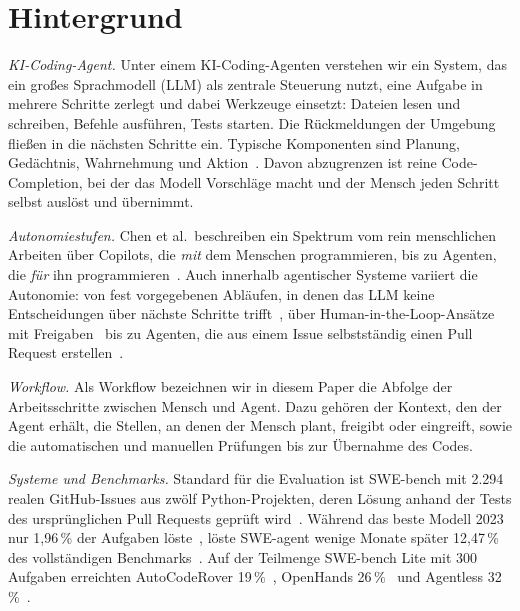 \section{Hintergrund}
\label{sec:hintergrund}

\textit{KI-Coding-Agent.} Unter einem KI-Coding-Agenten verstehen wir ein System, das ein großes Sprachmodell (LLM) als zentrale Steuerung nutzt, eine Aufgabe in mehrere Schritte zerlegt und dabei Werkzeuge einsetzt: Dateien lesen und schreiben, Befehle ausführen, Tests starten. Die Rückmeldungen der Umgebung fließen in die nächsten Schritte ein. Typische Komponenten sind Planung, Gedächtnis, Wahrnehmung und Aktion~\cite{liu2024agentsurvey}. Davon abzugrenzen ist reine Code-Completion, bei der das Modell Vorschläge macht und der Mensch jeden Schritt selbst auslöst und übernimmt.

\textit{Autonomiestufen.} Chen et al.\ beschreiben ein Spektrum vom rein menschlichen Arbeiten über Copilots, die \emph{mit} dem Menschen programmieren, bis zu Agenten, die \emph{für} ihn programmieren~\cite{chen2025codewithme}. Auch innerhalb agentischer Systeme variiert die Autonomie: von fest vorgegebenen Abläufen, in denen das LLM keine Entscheidungen über nächste Schritte trifft~\cite{xia2025agentless}, über Human-in-the-Loop-Ansätze mit Freigaben~\cite{takerngsaksiri2025hula} bis zu Agenten, die aus einem Issue selbstständig einen Pull Request erstellen~\cite{robbes2026agenticmuch}.

\textit{Workflow.} Als Workflow bezeichnen wir in diesem Paper die Abfolge der Arbeitsschritte zwischen Mensch und Agent. Dazu gehören der Kontext, den der Agent erhält, die Stellen, an denen der Mensch plant, freigibt oder eingreift, sowie die automatischen und manuellen Prüfungen bis zur Übernahme des Codes.

\textit{Systeme und Benchmarks.} Standard für die Evaluation ist SWE-bench mit 2.294 realen GitHub-Issues aus zwölf Python-Projekten, deren Lösung anhand der Tests des ursprünglichen Pull Requests geprüft wird~\cite{jimenez2024swebench}. Während das beste Modell 2023 nur 1,96\,\% der Aufgaben löste~\cite{jimenez2024swebench}, löste SWE-agent wenige Monate später 12,47\,\% des vollständigen Benchmarks~\cite{yang2024sweagent}. Auf der Teilmenge SWE-bench Lite mit 300 Aufgaben erreichten AutoCodeRover 19\,\%~\cite{zhang2024autocoderover}, OpenHands 26\,\%~\cite{wang2025openhands} und Agentless 32\,\%~\cite{xia2025agentless}.
